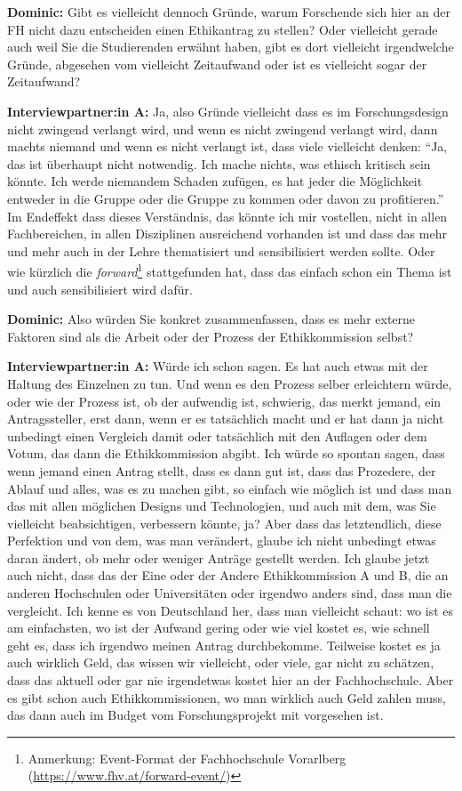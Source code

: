 \documentclass[a4paper,12pt,twoside]{scrreprt}
\begin{document}
\textbf{Dominic:} Gibt es vielleicht dennoch Gründe, warum Forschende sich hier an der FH nicht dazu entscheiden einen Ethikantrag zu stellen? Oder vielleicht gerade auch weil Sie die Studierenden erwähnt haben, gibt es dort vielleicht irgendwelche Gründe, abgesehen vom vielleicht Zeitaufwand oder ist es vielleicht sogar der Zeitaufwand?

\textbf{Interviewpartner:in A:} Ja, also Gründe vielleicht dass es im Forschungsdesign nicht zwingend verlangt wird, und wenn es nicht zwingend verlangt wird, dann machts niemand und wenn es nicht verlangt ist, dass viele vielleicht denken: \enquote{Ja, das ist überhaupt nicht notwendig. Ich mache nichts, was ethisch kritisch sein könnte. Ich werde niemandem Schaden zufügen, es hat jeder die Möglichkeit entweder in die Gruppe oder die Gruppe zu kommen oder davon zu profitieren.} Im Endeffekt dass dieses Verständnis, das könnte ich mir vostellen, nicht in allen Fachbereichen, in allen Disziplinen ausreichend vorhanden ist und dass das mehr und mehr auch in der Lehre thematisiert und sensibilisiert werden sollte. Oder wie kürzlich die \textit{forward}\footnote{Anmerkung: Event-Format der Fachhochschule Vorarlberg (\url{https://www.fhv.at/forward-event/})} stattgefunden hat, dass das einfach schon ein Thema ist und auch sensibilisiert wird dafür.

\textbf{Dominic:} Also würden Sie konkret zusammenfassen, dass es mehr externe Faktoren sind als die Arbeit oder der Prozess der Ethikkommission selbst?

\textbf{Interviewpartner:in A:} Würde ich schon sagen. Es hat auch etwas mit der Haltung des Einzelnen zu tun. Und wenn es den Prozess selber erleichtern würde, oder wie der Prozess ist, ob der aufwendig ist, schwierig, das merkt jemand, ein Antragssteller, erst dann, wenn er es tatsächlich macht und er hat dann ja nicht unbedingt einen Vergleich damit oder tatsächlich mit den Auflagen oder dem Votum, das dann die Ethikkommission abgibt. Ich würde so spontan sagen, dass wenn jemand einen Antrag stellt, dass es dann gut ist, dass das Prozedere, der Ablauf und alles, was es zu machen gibt, so einfach wie möglich ist und dass man das mit allen möglichen Designs und Technologien, und auch mit dem, was Sie vielleicht beabsichtigen, verbessern könnte, ja? Aber dass das letztendlich, diese Perfektion und von dem, was man verändert, glaube ich nicht unbedingt etwas daran ändert, ob mehr oder weniger Anträge gestellt werden. Ich glaube jetzt auch nicht, dass das der Eine oder der Andere Ethikkommission A und B, die an anderen Hochschulen oder Universitäten oder irgendwo anders sind, dass man die vergleicht. Ich kenne es von Deutschland her, dass man vielleicht schaut: wo ist es am einfachsten, wo ist der Aufwand gering oder wie viel kostet es, wie schnell geht es, dass ich irgendwo meinen Antrag durchbekomme. Teilweise kostet es ja auch wirklich Geld, das wissen wir vielleicht, oder viele, gar nicht zu schätzen, dass das aktuell oder gar nie irgendetwas kostet hier an der Fachhochschule. Aber es gibt schon auch Ethikkommissionen, wo man wirklich auch Geld zahlen muss, das dann auch im Budget vom Forschungsprojekt mit vorgesehen ist.
\end{document}

